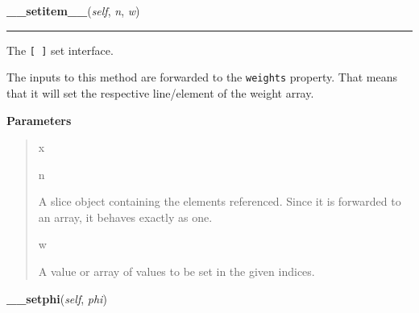     \begin{boxedminipage}{\textwidth}

    \raggedright \textbf{\_\_setitem\_\_}(\textit{self}, \textit{n}, \textit{w})

    \vspace{-1.5ex}

    \rule{\textwidth}{0.5\fboxrule}

The \texttt{{[} {]}} set interface.

The inputs to this method are forwarded to the \texttt{weights} property.
That means that it will set the respective line/element of the weight
array.
    \vspace{1ex}

      \textbf{Parameters}
      \begin{quote}
        \begin{Ventry}{x}

          \item[n]


A slice object containing the elements referenced. Since it is
forwarded to an array, it behaves exactly as one.
          \item[w]


A value or array of values to be set in the given indices.
        \end{Ventry}

      \end{quote}

    \vspace{1ex}

    \end{boxedminipage}

    \label{peach:nn:base:Layer:__setphi}

    \vspace{0.5ex}

    \begin{boxedminipage}{\textwidth}

    \raggedright \textbf{\_\_setphi}(\textit{self}, \textit{phi})

    \end{boxedminipage}

    \label{peach:nn:base:Layer:__setweights}

